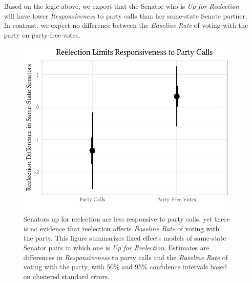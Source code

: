 \documentclass[12pt]{article}
\begin{document}
Based on the logic above, we expect that the Senator who is
\textit{Up for Reelection} will have lower \textit{Responsiveness} to party
calls than her same-state Senate partner.
In contrast, we expect no difference between the \textit{Baseline Rate} of
voting with the party on party-free votes.

\begin{figure}[t]
\centering
\includegraphics[width = 12cm]{senate_difference_estimates}
\caption{
  Senators up for reelection are less responsive to party calls, yet there is
  no evidence that reelection affects \textit{Baseline Rate} of voting with the
  party.
  This figure summarizes fixed effects models of same-state Senator pairs in
  which one is \textit{Up for Reelection}.
  Estimates are differences in \textit{Responsiveness} to party calls and the
  \textit{Baseline Rate} of voting with the party, with 50\% and 95\%
  confidence intervals based on clustered standard errors.
\label{fig-reelection-responsiveness}}
\end{figure}
\end{document}
